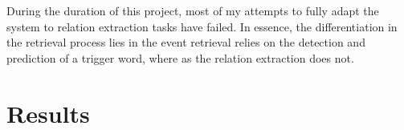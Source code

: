 During the duration of this project, most of my attempts to fully adapt the system to relation extraction tasks have failed. In essence, the differentiation in the retrieval process lies in the event retrieval relies on the detection and prediction of a trigger word, where as the relation extraction does not. 

\section{Results}

